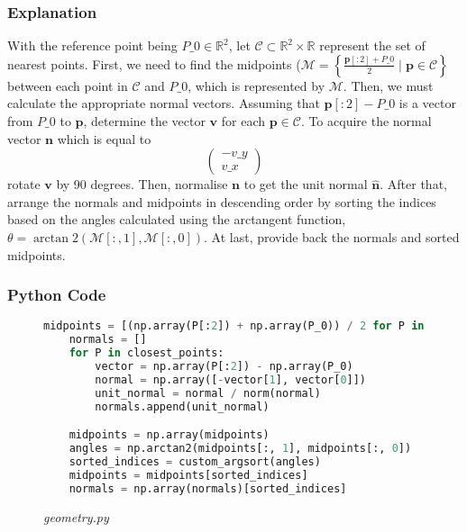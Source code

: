 \documentclass[12pt,a4paper]{report}
\begin{document}
\subsubsection{Explanation}
With the reference point being \( P\_0 \in \mathbb{R}^2 \), let \( \mathcal{C} \subset \mathbb{R}^2 \times \mathbb{R} \) represent the set of nearest points. First, we need to find the midpoints (\( \mathcal{M} = \left\{ \frac{\mathbf{p}[:2] + P\_0}{2} \mid \mathbf{p} \in \mathcal{C} \right\} \) between each point in \( \mathcal{C} \) and \( P\_0 \), which is represented by \( \mathcal{M} \). Then, we must calculate the appropriate normal vectors. Assuming that \( \mathbf{p}[:2] - P\_0 \) is a vector from \( P\_0 \) to \( \mathbf{p} \), determine the vector \( \mathbf{v} \) for each \( \mathbf{p} \in \mathcal{C} \). To acquire the normal vector \( \mathbf{n} \) which is equal to 
\[
\begin{pmatrix} 
-v\_y \\ 
v\_x 
\end{pmatrix} 
\]
rotate \( \mathbf{v} \) by 90 degrees. Then, normalise \( \mathbf{n} \) to get the unit normal \( \hat{\mathbf{n}} \). After that, arrange the normals and midpoints in descending order by sorting the indices based on the angles calculated using the arctangent function, \( \theta = \arctan2(\mathcal{M}[:, 1], \mathcal{M}[:, 0]) \). At last, provide back the normals and sorted midpoints.


\vspace*{\fill}\newpage

\subsubsection{Python Code}
\begin{figure}[ht!]
\centering
\caption*{\large\textit{geometry.py}}
\begin{lstlisting}[language=Python, caption={Midpoints and Normals Calculation}]
    midpoints = [(np.array(P[:2]) + np.array(P_0)) / 2 for P in closest_points]
    normals = []
    for P in closest_points:
        vector = np.array(P[:2]) - np.array(P_0)
        normal = np.array([-vector[1], vector[0]])
        unit_normal = normal / norm(normal)
        normals.append(unit_normal)

    midpoints = np.array(midpoints)
    angles = np.arctan2(midpoints[:, 1], midpoints[:, 0])
    sorted_indices = custom_argsort(angles)
    midpoints = midpoints[sorted_indices]
    normals = np.array(normals)[sorted_indices]
\end{lstlisting}
\end{figure}
\end{document}
